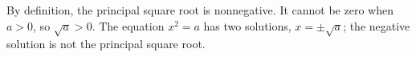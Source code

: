 By definition, the principal square root is nonnegative. It cannot be zero when $a>0$, so $\sqrt a>0$. The equation $x^2=a$ has two solutions, $\boxed{x=\pm\sqrt a}$; the negative solution is not the principal square root.
